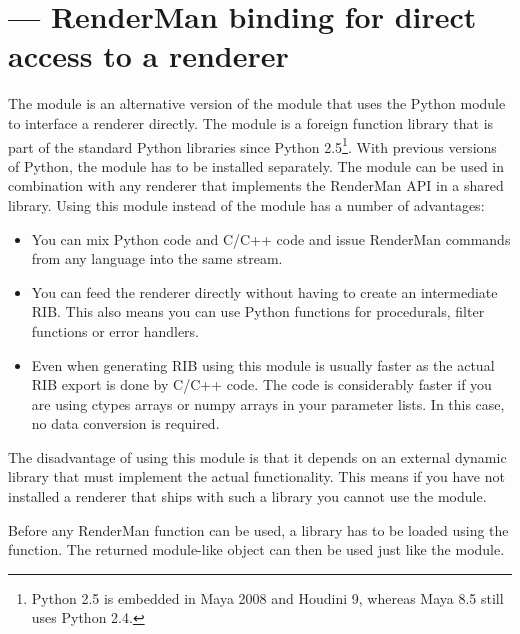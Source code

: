 \section{ ---
         RenderMan binding for direct access to a renderer}


The  module is an alternative version of the  module
that uses the Python  module to interface a renderer directly.
The  module is a foreign function library that is part of the
standard Python libraries since Python 2.5\footnote{Python 2.5 is embedded in
Maya 2008 and Houdini 9, whereas Maya 8.5 still uses Python 2.4.}.
With previous versions of Python, the module has to be installed separately. The module can be used in combination with any renderer
that implements the RenderMan API in a shared library. Using this module instead of 
the  module has a number of advantages:

\begin{itemize}
\item You can mix Python code and C/C++ code and
issue RenderMan commands from any language into the same stream.
\item You can feed the renderer directly without having to create an
intermediate RIB. This also means you can use Python functions for
procedurals, filter functions or error handlers.
\item Even when generating RIB using this module is usually faster as the
actual RIB export is done by C/C++ code. The code is considerably faster if
you are using ctypes arrays or numpy arrays in your parameter lists. In this
case, no data conversion is required.
\end{itemize}

The disadvantage of using this module is that it depends on an external
dynamic library that must implement the actual functionality. This means if you
have not installed a renderer that ships with such a library you cannot use the
module.

Before any RenderMan function can be used, a library has to be loaded using
the  function. The returned module-like object can then be
used just like the  module. 

